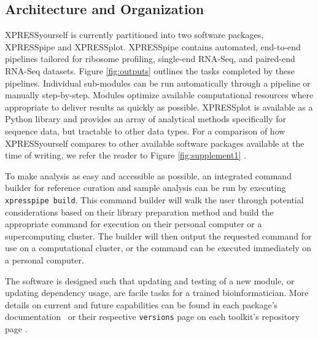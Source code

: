 \documentclass[10pt, oneside]{article}
\begin{document}
\subsection*{Architecture and Organization}
XPRESSyourself is currently partitioned into two software packages, XPRESSpipe and XPRESSplot. XPRESSpipe contains automated, end-to-end pipelines tailored for ribosome profiling, single-end RNA-Seq, and paired-end RNA-Seq datasets. Figure \ref{fig:outputs} outlines the tasks completed by these pipelines. Individual sub-modules can be run automatically through a pipeline or manually step-by-step. Modules optimize available computational resources where appropriate to deliver results as quickly as possible. XPRESSplot is available as a Python library and provides an array of analytical methods specifically for sequence data, but tractable to other data types. For a comparison of how XPRESSyourself compares to other available software packages available at the time of writing, we refer the reader to Figure \ref{fig:supplement1} \cite{galaxy, ribogalaxy, pausepred, anota2seq, riboprofiling, riborex, mqc, shoelaces, supertranscripts, systempiper, orfik, comet_1, comet_2, riboseqr, deeptools, picard, rose, rust, xtail, ribodiff, ribotaper, ribomap_1, ribomap_2, plastid, riboviz, ribostreamr, scikit_ribo, spectre}.\par

To make analysis as easy and accessible as possible, an integrated command builder for reference curation and sample analysis can be run by executing \texttt{xpresspipe build}. This command builder will walk the user through potential considerations based on their library preparation method and build the appropriate command for execution on their personal computer or a supercomputing cluster. The builder will then output the requested command for use on a computational cluster, or the command can be executed immediately on a personal computer.\par

The software is designed such that updating and testing of a new module, or updating dependency usage, are facile tasks for a trained bioinformatician. More details on current and future capabilities can be found in each package's documentation \cite{xpresspipe_docs, xpressplot_docs} or their respective \texttt{versions} page on each toolkit's repository page \cite{xpressyourself}.\\
\end{document}
